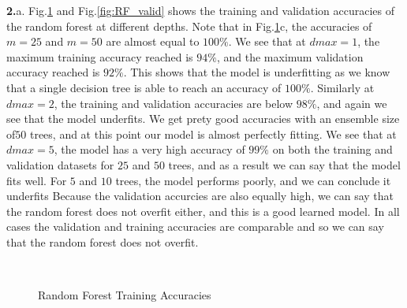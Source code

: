 \documentclass{article}
\begin{document}
\textbf{2.}a. Fig.\ref{fig:RF_train} and Fig.\ref{fig:RF_valid} shows the training  and validation accuracies of the random forest at different depths. Note that in Fig.\ref{fig:RF_train}c, the accuracies of $m=25$ and $m=50$ are almost equal to $100\%$. We see that at $dmax = 1$, the maximum training accuracy reached is $94\%$, and the maximum validation accuracy reached is $92\%$. This shows that the model is underfitting as we know that a single decision tree is able to reach an accuracy of $100\%$. Similarly at $dmax = 2$, the training and validation accuracies are below $98\%$, and again we see that the model underfits. We get prety good accuracies with an ensemble size of$50$ trees, and at this point our model is almost perfectly fitting. We see that at $dmax = 5$, the model has a very high accuracy of $99\%$ on both the training and validation datasets for $25$ and $50$ trees, and as a result we can say that the model fits well. For $5$ and $10$ trees, the model performs poorly, and we can conclude it underfits Because the validation accurcies are also equally high, we can say that the random forest does not overfit either, and this is a good learned model. In all cases the validation and training accuracies are comparable and so we can say that the random forest does not overfit.

\begin{figure}[H]
    \centering
    \\
\caption{Random Forest Training Accuracies}
    \label{fig:RF_train}%
\end{figure}
\end{document}

